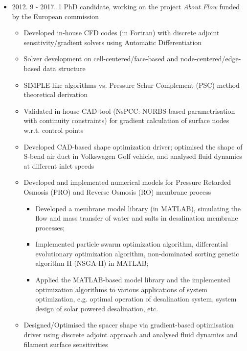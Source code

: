 \documentclass[letterpaper]{article}
\begin{document}
\begin{itemize}
\item 2012. 9 - 2017. 1  \hspace{2pt} PhD candidate, working on the project \textsl{About Flow} funded by the European commission
		\begin{itemize}
		\item Developed in-house CFD codes (in Fortran) with discrete adjoint sensitivity/gradient solvers using Automatic Differentiation
		\item Solver development on cell-centered/face-based and node-centered/edge-based data structure
		\item	SIMPLE-like algorithms vs. Pressure Schur Complement (PSC) method theoretical derivation
		\item 
		Validated in-house CAD tool (NsPCC: NURBS-based parametrisation with continuity constraints) for gradient calculation of surface nodes w.r.t. control points
		\item	Developed CAD-based shape optimization driver; optimised the shape of S-bend air duct in Volkswagen Golf vehicle, and analysed fluid dynamics at different inlet speeds%
		\item	Developed and implemented numerical models for Pressure Retarded Osmosis (PRO) and Reverse Osmosis (RO) membrane process
					\begin{itemize}
					\item Developed a membrane model library (in MATLAB), simulating the flow and mass transfer of water and salts in desalination membrane processes;
					\item Implemented particle swarm optimization algorithm, differential evolutionary optimization algorithm, non-dominated sorting genetic algorithm II (NSGA-II) in MATLAB;
					\item Applied the MATLAB-based model library and the implemented optimization algorithms to various applications of system optimization, e.g. optimal operation of desalination system, system design of solar powered desalination, etc.
					\end{itemize}
		\item Designed/Optimised the spacer shape via gradient-based optimisation driver using discrete adjoint approach and analysed fluid dynamics and filament surface sensitivities
		\end{itemize}
		

\end{itemize}
\end{document}
